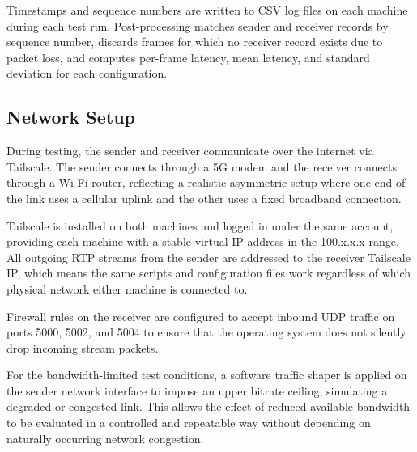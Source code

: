 Timestamps and sequence numbers are written to CSV log files on each machine during each test run. Post-processing matches sender and receiver records by sequence number, discards frames for which no receiver record exists due to packet loss, and computes per-frame latency, mean latency, and standard deviation for each configuration.


\subsection{Network Setup}

During testing, the sender and receiver communicate over the internet via Tailscale. The sender connects through a 5G modem and the receiver connects through a Wi-Fi router, reflecting a realistic asymmetric setup where one end of the link uses a cellular uplink and the other uses a fixed broadband connection.

Tailscale is installed on both machines and logged in under the same account, providing each machine with a stable virtual IP address in the 100.x.x.x range. All outgoing RTP streams from the sender are addressed to the receiver Tailscale IP, which means the same scripts and configuration files work regardless of which physical network either machine is connected to.

Firewall rules on the receiver are configured to accept inbound UDP traffic on ports 5000, 5002, and 5004 to ensure that the operating system does not silently drop incoming stream packets.

For the bandwidth-limited test conditions, a software traffic shaper is applied on the sender network interface to impose an upper bitrate ceiling, simulating a degraded or congested link. This allows the effect of reduced available bandwidth to be evaluated in a controlled and repeatable way without depending on naturally occurring network congestion.

